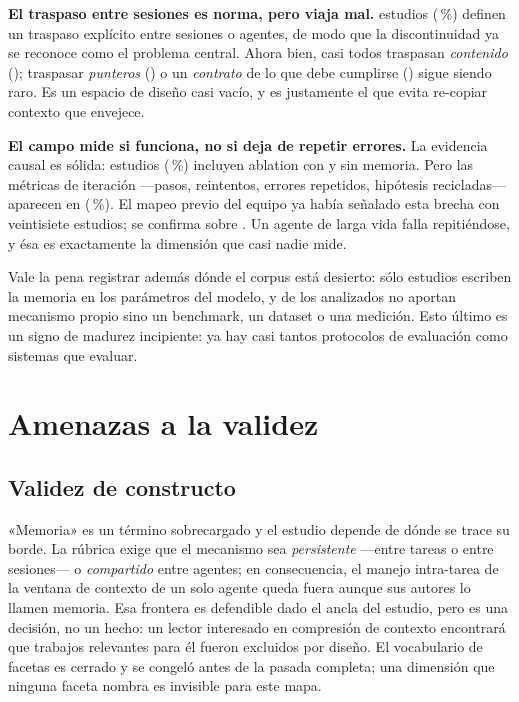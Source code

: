 \documentclass[conference]{IEEEtran}
\begin{document}
\textbf{El traspaso entre sesiones es norma, pero viaja mal.} \clRQcuatroHandoff{} estudios
(\clRQcuatroHandoffPct{}\,\%) definen un traspaso explícito entre sesiones o agentes, de modo que la
discontinuidad ya se reconoce como el problema central. Ahora bien, casi todos traspasan
\emph{contenido} (\clRQcuatroHandoffContenido{}); traspasar \emph{punteros}
(\clRQcuatroHandoffPunteros{}) o un \emph{contrato} de lo que debe cumplirse
(\clRQcuatroHandoffContrato{}) sigue siendo raro. Es un espacio de diseño casi vacío, y es
justamente el que evita re-copiar contexto que envejece.

\textbf{El campo mide si funciona, no si deja de repetir errores.} La evidencia causal es sólida:
\clRQcincoAblation{} estudios (\clRQcincoAblationPct{}\,\%) incluyen ablation con y sin memoria. Pero
las métricas de iteración —pasos, reintentos, errores repetidos, hipótesis recicladas— aparecen en
\clRQcincoMetricaIteracion{} (\clRQcincoMetricaIteracionPct{}\,\%). El mapeo previo del equipo ya
había señalado esta brecha con veintisiete estudios; se confirma sobre \clCarAnalizados{}. Un agente
de larga vida falla repitiéndose, y ésa es exactamente la dimensión que casi nadie mide.

Vale la pena registrar además dónde el corpus está desierto: sólo \clRQunoRepParametros{} estudios
escriben la memoria en los parámetros del modelo, y \clRQunoSinMecanismo{} de los analizados no
aportan mecanismo propio sino un benchmark, un dataset o una medición. Esto último es un signo de
madurez incipiente: ya hay casi tantos protocolos de evaluación como sistemas que evaluar.

\section{Amenazas a la validez}
\label{sec:threats}

\subsection{Validez de constructo}

«Memoria» es un término sobrecargado y el estudio depende de dónde se trace su borde. La rúbrica
exige que el mecanismo sea \emph{persistente} —entre tareas o entre sesiones— o \emph{compartido}
entre agentes; en consecuencia, el manejo intra-tarea de la ventana de contexto de un solo agente
queda fuera aunque sus autores lo llamen memoria. Esa frontera es defendible dado el ancla del
estudio, pero es una decisión, no un hecho: un lector interesado en compresión de contexto encontrará
que trabajos relevantes para él fueron excluidos por diseño. El vocabulario de facetas es cerrado y
se congeló antes de la pasada completa; una dimensión que ninguna faceta nombra es invisible para
este mapa.
\end{document}

